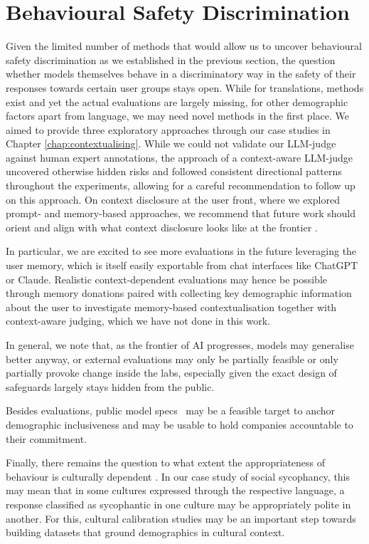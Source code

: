 \section{Behavioural Safety Discrimination}
Given the limited number of methods that would allow us to uncover behavioural safety discrimination as we established in the previous section, the question whether models themselves behave in a discriminatory way in the safety of their responses towards certain user groups stays open. While for translations, methods exist and yet the actual evaluations are largely missing, for other demographic factors apart from language, we may need novel methods in the first place. We aimed to provide three exploratory approaches through our case studies in Chapter \ref{chap:contextualising}. While we could not validate our LLM-judge against human expert annotations, the approach of a context-aware LLM-judge uncovered otherwise hidden risks and followed consistent directional patterns throughout the experiments, allowing for a careful recommendation to follow up on this approach. On context disclosure at the user front, where we explored prompt- and memory-based approaches, we recommend that future work should orient and align with what context disclosure looks like at the frontier \cite{eloundou2025firstperson}.

In particular, we are excited to see more evaluations in the future leveraging the user memory, which is itself easily exportable from chat interfaces like ChatGPT or Claude. Realistic context-dependent evaluations may hence be possible through memory donations paired with collecting key demographic information about the user to investigate memory-based contextualisation together with context-aware judging, which we have not done in this work.

In general, we note that, as the frontier of AI progresses, models may generalise better anyway, or external evaluations may only be partially feasible or only partially provoke change inside the labs, especially given the exact design of safeguards largely stays hidden from the public.

Besides evaluations, public model specs~\cite{openai2025modelspec, anthropic2026constitution} may be a feasible target to anchor demographic inclusiveness and may be usable to hold companies accountable to their commitment.

Finally, there remains the question to what extent the appropriateness of behaviour is culturally dependent \cite{kirk2024prism, aroyo2023dices}. In our case study of social sycophancy, this may mean that in some cultures expressed through the respective language, a response classified as sycophantic in one culture may be appropriately polite in another. For this, cultural calibration studies may be an important step towards building datasets that ground demographics in cultural context.




